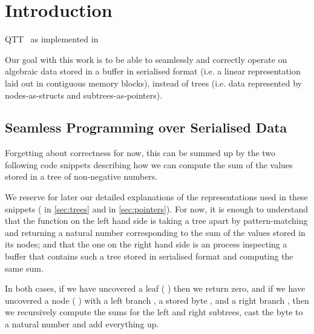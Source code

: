 \section{Introduction}



QTT~\cite{DBLP:conf/birthday/McBride16, DBLP:conf/lics/Atkey18}
as implemented in \idris{}~\cite{DBLP:conf/ecoop/Brady21}




Our goal with this work is to be able to seamlessly and correctly
operate on algebraic data stored in a buffer in serialised format
(i.e. a linear representation laid out in contiguous memory blocks),
instead of trees
(i.e. data represented by nodes-as-structs and subtrees-as-pointers).

\subsection{Seamless Programming over Serialised Data}

Forgetting about correctness for now, this can be summed up by the
two following code snippets describing how we can compute the sum
of the values stored in a tree of non-negative numbers.

\noindent
\begin{minipage}{.4\textwidth}
\end{minipage}
\hfill\begin{minipage}{.55\textwidth}
\end{minipage}

We reserve for later our detailed explanations of the representations
used in these snippets
( in \cref{sec:trees} and
 in \cref{sec:pointers}).
%
For now, it is enough to understand that the function on the left hand
side is taking a tree apart by pattern-matching and returning a natural
number corresponding to the sum of the values stored in its nodes;
%
and that the one on the right hand side is an  process
inspecting a buffer that contains such a tree stored in serialised format
and computing the same sum.

In both cases, if we have uncovered a leaf
({ } \IdrisKeyword{\KatlaUnderscore{}})
then we return zero,
and if we have uncovered a node
({ } \IdrisKeyword{(} \IdrisData{\#}   \IdrisData{\#} \IdrisKeyword{)})
with
a left branch ,
a stored byte ,
and a right branch ,
then we recursively compute the sums for the left and right subtrees,
cast the byte to a natural number and add everything up.

